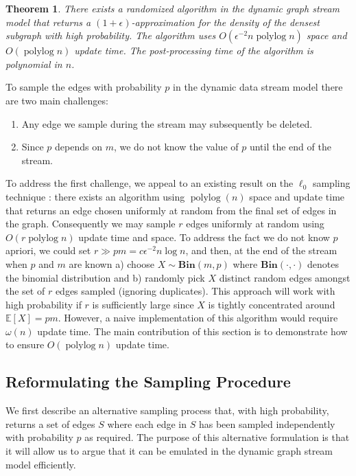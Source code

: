 \documentclass[11pt]{article}
\newtheorem{theorem}{Theorem}\newtheorem{definition}[theorem]{Definition}
\newcommand{\expec}[1]{\mathbb E\left [ #1 \right ]}
\DeclareMathOperator{\polylog}{polylog}
\newcommand{\bin}{{\mathbf{Bin}}}
\begin{document}
\begin{theorem}\label{thm:bigthm}
There exists a randomized algorithm in the dynamic graph stream model that returns a $(1+\epsilon)$-approximation for the density of the densest subgraph with high probability. The algorithm uses $O(\epsilon^{-2} n\polylog n)$ space and $O(\polylog n)$ update time. The post-processing time of the algorithm is polynomial in $n$.
\end{theorem}

To sample the edges with probability $p$ in the dynamic data stream model there are two main challenges: 
\begin{enumerate}
\item Any edge we sample during the stream may subsequently be deleted. 
\item Since $p$ depends on $m$, we do not know the value of $p$ until the end of the stream. 
\end{enumerate}
To address the first challenge, we appeal to an existing result on the $\ell_0$ sampling technique \cite{JowhariST11}: there exists an algorithm using $\polylog(n)$ space and update time that returns an edge chosen uniformly at random from the final set of edges in the graph. Consequently we may sample $r$ edges uniformly at random using $O(r\polylog n)$ update time and space. To address the fact we do not know $p$ apriori, we could set $r\gg pm=c\epsilon^{-2} n \log n$, and then, at the end of the stream when $p$ and $m$ are known a) choose $X \sim \bin(m,p)$ where  $\bin(\cdot,\cdot)$ denotes the binomial distribution and b) randomly pick $X$ distinct random edges amongst  the set of $r$ edges sampled (ignoring duplicates). This approach will work with high probability if $r$ is sufficiently large since $X$ is tightly concentrated around $\expec{X}=pm$.
However, a naive implementation of this algorithm would require $\omega(n)$ update time. The main contribution of this section is to demonstrate how to ensure $O(\polylog n)$ update time.


\subsection{Reformulating the Sampling Procedure}

We first describe an alternative sampling process that, with high probability, returns a set of edges $S$ where each edge in $S$ has been sampled independently with probability $p$ as required. The purpose of this alternative formulation is that it will allow us to argue that it can be emulated in the dynamic graph stream  model efficiently.
\end{document}
